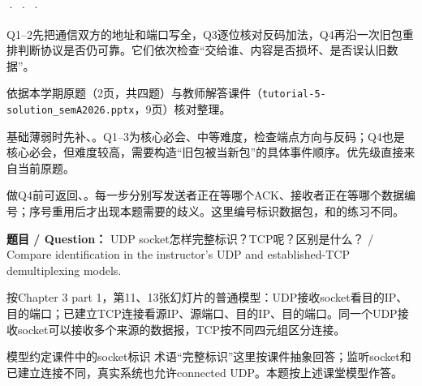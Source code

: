 





 ·  ·  · 


Q1–2先把通信双方的地址和端口写全，Q3逐位核对反码加法，Q4再沿一次旧包重排判断协议是否仍可靠。它们依次检查“交给谁、内容是否损坏、是否误认旧数据”。

依据本学期原题（2页，共四题）与教师解答课件（\texttt{tutorial-5-solution\_semA2026.pptx}，9页）核对整理。


基础薄弱时先补、。Q1–3为核心必会、中等难度，检查端点方向与反码；Q4也是核心必会，但难度较高，需要构造“旧包被当新包”的具体事件顺序。优先级直接来自当前原题。


做Q4前可返回、。每一步分别写发送者正在等哪个ACK、接收者正在等哪个数据编号；序号重用后才出现本题需要的歧义。这里编号标识数据包，和的练习不同。








\textbf{题目 / Question：} UDP socket怎样完整标识？TCP呢？区别是什么？ / Compare identification in the instructor's UDP and established-TCP demultiplexing models.


按Chapter 3 part 1，第11、13张幻灯片的普通模型：UDP接收socket看目的IP、目的端口；已建立TCP连接看源IP、源端口、目的IP、目的端口。同一个UDP接收socket可以接收多个来源的数据报，TCP按不同四元组区分连接。


\begin{StudyBlock}{模型约定}{课件中的socket标识}
术语“完整标识”这里按课件抽象回答；监听socket和已建立连接不同，真实系统也允许connected UDP。本题按上述课堂模型作答。
\end{StudyBlock}


